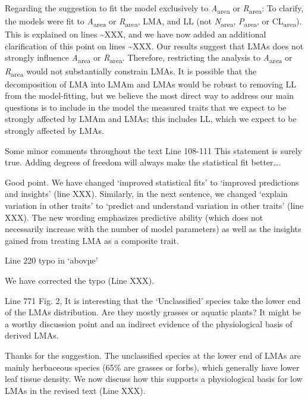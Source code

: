 \documentclass[
  12pt,
  letterpaper,
  DIV=11,
  numbers=noendperiod]{scrartcl}
\renewenvironment{quote}
  {\begin{customblockquote}\color{blockquote-text}\ignorespaces}
  {\end{customblockquote}}
\begin{document}
Regarding the suggestion to fit the model exclusively to
\emph{A}\textsubscript{area} or \emph{R}\textsubscript{area}: To
clarify, the models were fit to \emph{A}\textsubscript{area} or
\emph{R}\textsubscript{area}, LMA, and LL (not
\emph{N}\textsubscript{area}, \emph{P}\textsubscript{area}, or
CL\textsubscript{area}). This is explained on lines \textasciitilde XXX,
and we have now added an additional clarification of this point on lines
\textasciitilde XXX. Our results suggest that LMAs does not strongly
influence \emph{A}\textsubscript{area} or \emph{R}\textsubscript{area}.
Therefore, restricting the analysis to \emph{A}\textsubscript{area} or
\emph{R}\textsubscript{area} would not substantially constrain LMAs. It
is possible that the decomposition of LMA into LMAm and LMAs would be
robust to removing LL from the model-fitting, but we believe the most
direct way to address our main questions is to include in the model the
measured traits that we expect to be strongly affected by LMAm and LMAs;
this includes LL, which we expect to be strongly affected by LMAs.

\begin{quote}
Some minor comments throughout the text Line 108-111 This statement is
surely true. Adding degrees of freedom will always make the statistical
fit better\ldots.
\end{quote}

Good point. We have changed `improved statistical fits' to `improved
predictions and insights' (line XXX). Similarly, in the next sentence,
we changed `explain variation in other traits' to `predict and
understand variation in other traits' (line XXX). The new wording
emphasizes predictive ability (which does not necessarily increase with
the number of model parameters) as well as the insights gained from
treating LMA as a composite trait.

\begin{quote}
Line 220 typo in `abovµe'
\end{quote}

We have corrected the typo (Line XXX).

\begin{quote}
Line 771 Fig. 2, It is interesting that the `Unclassified' species take
the lower end of the LMAs distribution. Are they mostly grasses or
aquatic plants? It might be a worthy discussion point and an indirect
evidence of the physiological basis of derived LMAs.
\end{quote}

Thanks for the suggestion. The unclassified species at the lower end of
LMAs are mainly herbaceous species (65\% are grasses or forbs), which
generally have lower leaf tissue density. We now discuss how this
supports a physiological basis for low LMAs in the revised text (Line
XXX).
\end{document}
